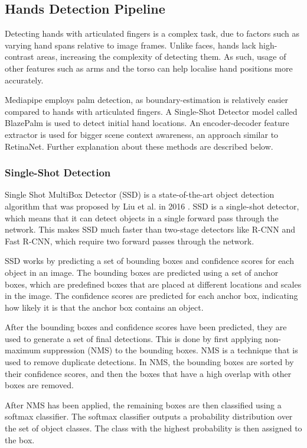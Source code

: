 \documentclass[final,dissertation.tex]{subfiles}
\begin{document}
\subsection{Hands Detection Pipeline}

Detecting hands with articulated fingers is a complex task, due to factors such as varying hand spans relative to image frames. Unlike faces, hands lack high-contrast areas, increasing the complexity of detecting them. As such, usage of other features such as arms and the torso can help localise hand positions more accurately.

Mediapipe employs palm detection, as boundary-estimation is relatively easier compared to hands with articulated fingers. A Single-Shot Detector model called BlazePalm is used to detect initial hand locations. An encoder-decoder feature extractor is used for bigger scene context awareness, an approach similar to RetinaNet. Further explanation about these methods are described below.

\subsubsection{Single-Shot Detection}

Single Shot MultiBox Detector (SSD) is a state-of-the-art object detection algorithm that was proposed by Liu et al. in 2016 \cite{liu2016ssd}. SSD is a single-shot detector, which means that it can detect objects in a single forward pass through the network. This makes SSD much faster than two-stage detectors like R-CNN and Fast R-CNN, which require two forward passes through the network.

SSD works by predicting a set of bounding boxes and confidence scores for each object in an image. The bounding boxes are predicted using a set of anchor boxes, which are predefined boxes that are placed at different locations and scales in the image. The confidence scores are predicted for each anchor box, indicating how likely it is that the anchor box contains an object.

After the bounding boxes and confidence scores have been predicted, they are used to generate a set of final detections. This is done by first applying non-maximum suppression (NMS) to the bounding boxes. NMS is a technique that is used to remove duplicate detections. In NMS, the bounding boxes are sorted by their confidence scores, and then the boxes that have a high overlap with other boxes are removed.

After NMS has been applied, the remaining boxes are then classified using a softmax classifier. The softmax classifier outputs a probability distribution over the set of object classes. The class with the highest probability is then assigned to the box.
\end{document}
